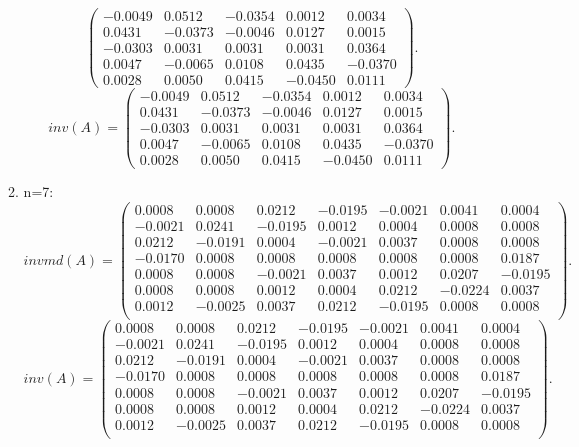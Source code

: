 \documentclass[12pt]{article}
\begin{document}
\begin{enumerate}
\begin{enumerate}
\[\begin{pmatrix}
-0.0049 & 0.0512 & -0.0354 & 0.0012 & 0.0034 \\
0.0431 & -0.0373 & -0.0046 & 0.0127 & 0.0015 \\
-0.0303 & 0.0031 & 0.0031 & 0.0031 & 0.0364 \\
0.0047 & -0.0065 & 0.0108 & 0.0435 & -0.0370 \\
0.0028 & 0.0050  & 0.0415 & -0.0450 & 0.0111
\end{pmatrix}.
\]
\[
inv(A)=\begin{pmatrix}
-0.0049 & 0.0512 & -0.0354 & 0.0012 & 0.0034 \\
0.0431 & -0.0373 & -0.0046 & 0.0127 & 0.0015 \\
-0.0303 & 0.0031 & 0.0031 & 0.0031 & 0.0364 \\
0.0047 & -0.0065 & 0.0108 & 0.0435 & -0.0370 \\
0.0028 & 0.0050  & 0.0415 & -0.0450 & 0.0111
\end{pmatrix}.
\]
\item n=7:
\[
invmd(A)=\begin{pmatrix}
0.0008 & 0.0008 & 0.0212 & -0.0195 & -0.0021 & 0.0041 & 0.0004 \\
-0.0021 & 0.0241 & -0.0195 & 0.0012 & 0.0004 & 0.0008 & 0.0008 \\
0.0212 & -0.0191 & 0.0004 & -0.0021 & 0.0037 & 0.0008 & 0.0008 \\
-0.0170 & 0.0008 & 0.0008 & 0.0008 & 0.0008 & 0.0008 & 0.0187 \\
0.0008 & 0.0008  & -0.0021 & 0.0037 & 0.0012 & 0.0207 & -0.0195 \\
0.0008 & 0.0008 & 0.0012 & 0.0004 & 0.0212 & -0.0224 & 0.0037 \\
0.0012 & -0.0025 & 0.0037 & 0.0212 & -0.0195 & 0.0008 & 0.0008\\
\end{pmatrix}.
\]
\[
inv(A)=\begin{pmatrix}
0.0008 & 0.0008 & 0.0212 & -0.0195 & -0.0021 & 0.0041 & 0.0004 \\
-0.0021 & 0.0241 & -0.0195 & 0.0012 & 0.0004 & 0.0008 & 0.0008 \\
0.0212 & -0.0191 & 0.0004 & -0.0021 & 0.0037 & 0.0008 & 0.0008 \\
-0.0170 & 0.0008 & 0.0008 & 0.0008 & 0.0008 & 0.0008 & 0.0187 \\
0.0008 & 0.0008  & -0.0021 & 0.0037 & 0.0012 & 0.0207 & -0.0195 \\
0.0008 & 0.0008 & 0.0012 & 0.0004 & 0.0212 & -0.0224 & 0.0037 \\
0.0012 & -0.0025 & 0.0037 & 0.0212 & -0.0195 & 0.0008 & 0.0008\\
\end{pmatrix}.
\]
\end{enumerate}
\end{enumerate}
\end{document}
